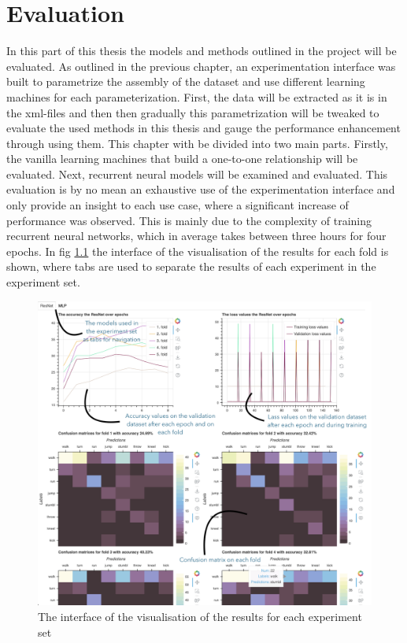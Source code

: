 \chapter{Evaluation}\label{chap:evaluation}
	In this part of this thesis the models and methods outlined in the project will be evaluated. As outlined in the previous chapter, an experimentation interface was built to parametrize the assembly of the dataset and use different learning machines for each parameterization. First, the data will be extracted as it is in the xml-files and then then gradually this parametrization will be tweaked to evaluate the used methods in this thesis and gauge the performance enhancement through using them. This chapter with be divided into two main parts. Firstly, the vanilla learning machines that build a one-to-one relationship will be evaluated. Next, recurrent neural models will be examined and evaluated. This evaluation is by no mean an exhaustive use of the experimentation interface and only provide an insight to each use case, where a significant increase of performance was observed. This is mainly due to the complexity of training recurrent neural networks, which in average takes between three hours for four epochs.\newline
	In fig \ref{fig:vis_example} the interface of the visualisation of the results for each fold is shown, where tabs are used to separate the results of each experiment in the experiment set.
	\begin{figure}[H]
		\centering
		\includegraphics[width=\textwidth]{img/the-interface-of-the-visualisation-of-the-results-for-each-experiment-set.png}
		\caption{The interface of the visualisation of the results for each experiment set}
		\label{fig:vis_example}
	\end{figure}
